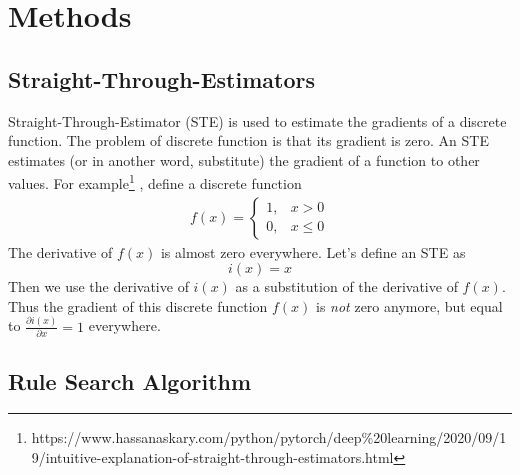 \chapter{Methods}

\section{Straight-Through-Estimators}
Straight-Through-Estimator (STE)\cite{STE} is used to estimate the gradients of a discrete function. The problem of discrete function is that its gradient is zero.
An STE estimates (or in another word, substitute)  the gradient of a function to other values. For example\footnote{https://www.hassanaskary.com/python/pytorch/deep\%20learning/2020/09/19/intuitive-explanation-of-straight-through-estimators.html}
, define a discrete function 
\begin{equation}
	\begin{split}
		f(x) = \begin{cases}
			1, & x > 0\\
			0, & x\le 0
		\end{cases}
	\end{split}
\end{equation}
The derivative of $ f(x) $ is almost zero everywhere. Let's define an STE as
\[ i(x) = x \]
Then we use the derivative of $ i(x) $ as a substitution of the derivative of $ f(x) $. Thus the gradient of this discrete function $ f(x) $ is \textit{not} zero anymore, but equal to $ \frac{\partial i(x)}{\partial x} = 1 $ everywhere. 


\section{Rule Search Algorithm}

%		




